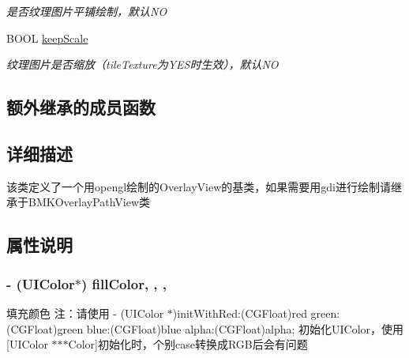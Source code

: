 \begin{DoxyCompactItemize}
\begin{DoxyCompactList}\small\item\em 是否纹理图片平铺绘制，默认\+N\+O \end{DoxyCompactList}\item 
\hypertarget{interface_b_m_k_overlay_g_l_basic_view_aa795b105b71d2f5bed7855618862324d}{}B\+O\+O\+L \hyperlink{interface_b_m_k_overlay_g_l_basic_view_aa795b105b71d2f5bed7855618862324d}{keep\+Scale}\label{interface_b_m_k_overlay_g_l_basic_view_aa795b105b71d2f5bed7855618862324d}

\begin{DoxyCompactList}\small\item\em 纹理图片是否缩放（tile\+Texture为\+Y\+E\+S时生效），默认\+N\+O \end{DoxyCompactList}\end{DoxyCompactItemize}
\subsection*{额外继承的成员函数}


\subsection{详细描述}
该类定义了一个用opengl绘制的\+Overlay\+View的基类，如果需要用gdi进行绘制请继承于\+B\+M\+K\+Overlay\+Path\+View类 

\subsection{属性说明}
\hypertarget{interface_b_m_k_overlay_g_l_basic_view_a8eb0ecfa09f5ab1b71f3ec4cfa9a2c70}{}
\subsubsection[{fill\+Color}]{\setlength{\rightskip}{0pt plus 5cm}-\/ (U\+I\+Color$\ast$) fill\+Color\hspace{0.3cm}{\ttfamily [read]}, {\ttfamily [write]}, {\ttfamily [nonatomic]}, {\ttfamily [strong]}}\label{interface_b_m_k_overlay_g_l_basic_view_a8eb0ecfa09f5ab1b71f3ec4cfa9a2c70}
填充颜色 注：请使用 -\/ (U\+I\+Color $\ast$)init\+With\+Red\+:(\+C\+G\+Float)red green\+:(\+C\+G\+Float)green blue\+:(\+C\+G\+Float)blue alpha\+:(\+C\+G\+Float)alpha; 初始化\+U\+I\+Color，使用\mbox{[}U\+I\+Color $\ast$$\ast$$\ast$\+Color\mbox{]}初始化时，个别case转换成\+R\+G\+B后会有问题 \hypertarget{interface_b_m_k_overlay_g_l_basic_view_a99dfabd79cc8a845a742f5ee5742c626}{}
